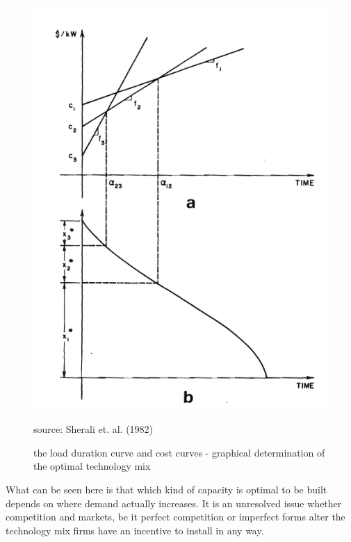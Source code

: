 \begin{figure}[h]
\centering
\includegraphics[width=.5\textwidth]{capacity/technology_choice_sherali}
      \label{technology_choice_sherali}            
      \caption{the load duration curve and cost curves - graphical determination of the optimal technology mix}
      source: Sherali et. al. (1982)
\end{figure}

What can be seen here is that which kind of capacity is optimal to be built depends on where demand actually increases. It is an unresolved issue whether competition and markets, be it perfect competition or imperfect forms alter the technology mix firms have an incentive to install in any way.

